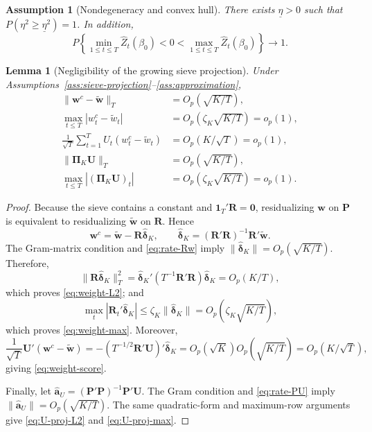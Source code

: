 \documentclass{article}
\newtheorem{lemma}{Lemma}
\newtheorem{assumption}{Assumption}
\begin{document}
\begin{assumption}[Nondegeneracy and convex hull]
\label{ass:convex-hull}
There exists \(\underline\eta>0\) such that
\(P(\eta^2\geq\underline\eta^2)=1\).  In addition,
\[
    P\left\{
      \min_{1\leq t\leq T}\widehat Z_t(\beta_0)<0<
      \max_{1\leq t\leq T}\widehat Z_t(\beta_0)
    \right\}\longrightarrow1.
\]
\end{assumption}

\begin{lemma}[Negligibility of the growing sieve projection]
\label{lem:projection-negligible}
Under Assumptions~\ref{ass:sieve-projection}--\ref{ass:approximation},
\begin{align}
    \|\bm w^c-\widetilde{\bm w}\|_T
       &=O_p\!\left(\sqrt{K/T}\right),                                   \label{eq:weight-L2}\\
    \max_{t\leq T}|w_t^c-\widetilde w_t|
       &=O_p\!\left(\zeta_K\sqrt{K/T}\right)=o_p(1),                    \label{eq:weight-max}\\
    \frac1{\sqrt T}\sum_{t=1}^T
       U_t(w_t^c-\widetilde w_t)
       &=O_p(K/\sqrt T)=o_p(1),                                           \label{eq:weight-score}\\
    \|\bm\Pi_K\bm U\|_T
       &=O_p\!\left(\sqrt{K/T}\right),                                  \label{eq:U-proj-L2}\\
    \max_{t\leq T}|(\bm\Pi_K\bm U)_t|
       &=O_p\!\left(\zeta_K\sqrt{K/T}\right)=o_p(1).                   \label{eq:U-proj-max}
\end{align}
\end{lemma}

\begin{proof}
Because the sieve contains a constant and \(\bm1_T'\bm R=\bm0\), residualizing
\(\bm w\) on \(\bm P\) is equivalent to residualizing
\(\widetilde{\bm w}\) on \(\bm R\).  Hence
\[
    \bm w^c=\widetilde{\bm w}-\bm R\widehat{\bm\delta}_K,
    \qquad
    \widehat{\bm\delta}_K
       =(\bm R'\bm R)^{-1}\bm R'\widetilde{\bm w}.
\]
The Gram-matrix condition and \eqref{eq:rate-Rw} imply
\(\|\widehat{\bm\delta}_K\|=O_p(\sqrt{K/T})\).  Therefore,
\[
    \|\bm R\widehat{\bm\delta}_K\|_T^2
       =\widehat{\bm\delta}_K'
          (T^{-1}\bm R'\bm R)\widehat{\bm\delta}_K
       =O_p(K/T),
\]
which proves \eqref{eq:weight-L2}; and
\[
    \max_t|\bm R_t'\widehat{\bm\delta}_K|
       \leq\zeta_K\|\widehat{\bm\delta}_K\|
       =O_p\!\left(\zeta_K\sqrt{K/T}\right),
\]
which proves \eqref{eq:weight-max}.  Moreover,
\[
    \frac1{\sqrt T}\bm U'(\bm w^c-\widetilde{\bm w})
      =-\left(T^{-1/2}\bm R'\bm U\right)'
          \widehat{\bm\delta}_K
      =O_p(\sqrt K)O_p\!\left(\sqrt{K/T}\right)
      =O_p(K/\sqrt T),
\]
giving \eqref{eq:weight-score}.

Finally, let
\(\widehat{\bm a}_U=(\bm P'\bm P)^{-1}\bm P'\bm U\).  The Gram condition
and \eqref{eq:rate-PU} imply
\(\|\widehat{\bm a}_U\|=O_p(\sqrt{K/T})\).  The same quadratic-form and
maximum-row arguments give \eqref{eq:U-proj-L2} and
\eqref{eq:U-proj-max}.
\end{proof}
\end{document}
